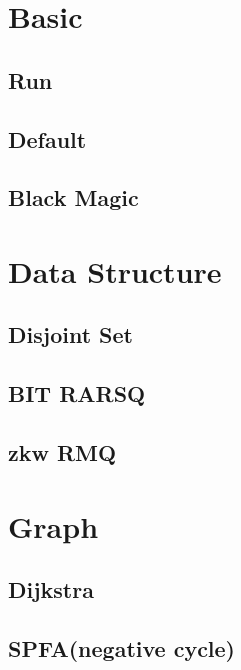 \section{Basic}
    \subsection{Run}
        
    \subsection{Default}
        
    \subsection{Black Magic}
        
    
\section{Data Structure}
    \subsection{Disjoint Set}
        
    \subsection{BIT RARSQ}
        
    \subsection{zkw RMQ}
        

\section{Graph}
    \subsection{Dijkstra}
        
    \subsection{SPFA(negative cycle)}
        
